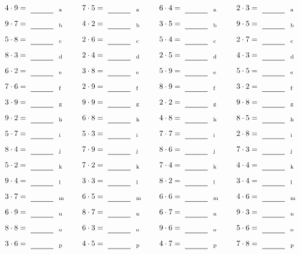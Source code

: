 \documentclass
[
  draft    = true,
  fontsize = 11pt,
  parskip  = half-
]
{scrartcl}
\begin{document}
\par\vfill\par
\begin{align*}
    \pline{4\cdot9}&=\rline{a}
  & \pline{7\cdot5}&=\rline{a}
  & \pline{6\cdot4}&=\rline{a}
  & \pline{2\cdot3}&=\rline{a} \\[1ex]
    \pline{9\cdot7}&=\rline{b}
  & \pline{4\cdot2}&=\rline{b}
  & \pline{3\cdot5}&=\rline{b}
  & \pline{9\cdot5}&=\rline{b} \\[1ex]
    \pline{5\cdot8}&=\rline{c}
  & \pline{2\cdot6}&=\rline{c}
  & \pline{5\cdot4}&=\rline{c}
  & \pline{2\cdot7}&=\rline{c} \\[1ex]
    \pline{8\cdot3}&=\rline{d}
  & \pline{2\cdot4}&=\rline{d}
  & \pline{2\cdot5}&=\rline{d}
  & \pline{4\cdot3}&=\rline{d} \\[1ex]
    \pline{6\cdot2}&=\rline{e}
  & \pline{3\cdot8}&=\rline{e}
  & \pline{5\cdot9}&=\rline{e}
  & \pline{5\cdot5}&=\rline{e} \\[1ex]
    \pline{7\cdot6}&=\rline{f}
  & \pline{2\cdot9}&=\rline{f}
  & \pline{8\cdot9}&=\rline{f}
  & \pline{3\cdot2}&=\rline{f} \\[1ex]
    \pline{3\cdot9}&=\rline{g}
  & \pline{9\cdot9}&=\rline{g}
  & \pline{2\cdot2}&=\rline{g}
  & \pline{9\cdot8}&=\rline{g} \\[1ex]
    \pline{9\cdot2}&=\rline{h}
  & \pline{6\cdot8}&=\rline{h}
  & \pline{4\cdot8}&=\rline{h}
  & \pline{8\cdot5}&=\rline{h} \\[1ex]
    \pline{5\cdot7}&=\rline{i}
  & \pline{5\cdot3}&=\rline{i}
  & \pline{7\cdot7}&=\rline{i}
  & \pline{2\cdot8}&=\rline{i} \\[1ex]
    \pline{8\cdot4}&=\rline{j}
  & \pline{7\cdot9}&=\rline{j}
  & \pline{8\cdot6}&=\rline{j}
  & \pline{7\cdot3}&=\rline{j} \\[1ex]
    \pline{5\cdot2}&=\rline{k}
  & \pline{7\cdot2}&=\rline{k}
  & \pline{7\cdot4}&=\rline{k}
  & \pline{4\cdot4}&=\rline{k} \\[1ex]
    \pline{9\cdot4}&=\rline{l}
  & \pline{3\cdot3}&=\rline{l}
  & \pline{8\cdot2}&=\rline{l}
  & \pline{3\cdot4}&=\rline{l} \\[1ex]
    \pline{3\cdot7}&=\rline{m}
  & \pline{6\cdot5}&=\rline{m}
  & \pline{6\cdot6}&=\rline{m}
  & \pline{4\cdot6}&=\rline{m} \\[1ex]
    \pline{6\cdot9}&=\rline{n}
  & \pline{8\cdot7}&=\rline{n}
  & \pline{6\cdot7}&=\rline{n}
  & \pline{9\cdot3}&=\rline{n} \\[1ex]
    \pline{8\cdot8}&=\rline{o}
  & \pline{6\cdot3}&=\rline{o}
  & \pline{9\cdot6}&=\rline{o}
  & \pline{5\cdot6}&=\rline{o} \\[1ex]
    \pline{3\cdot6}&=\rline{p}
  & \pline{4\cdot5}&=\rline{p}
  & \pline{4\cdot7}&=\rline{p}
  & \pline{7\cdot8}&=\rline{p}
\end{align*}
\end{document}
